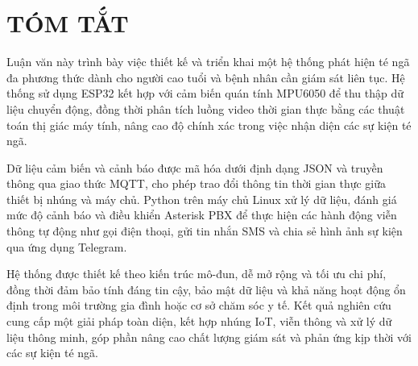 \chapter*{TÓM TẮT}

Luận văn này trình bày việc thiết kế và triển khai một hệ thống phát hiện té ngã đa phương thức dành cho người cao tuổi và bệnh nhân cần giám sát liên tục. Hệ thống sử dụng ESP32 kết hợp với cảm biến quán tính MPU6050 để thu thập dữ liệu chuyển động, đồng thời phân tích luồng video thời gian thực bằng các thuật toán thị giác máy tính, nâng cao độ chính xác trong việc nhận diện các sự kiện té ngã.

Dữ liệu cảm biến và cảnh báo được mã hóa dưới định dạng JSON và truyền thông qua giao thức MQTT, cho phép trao đổi thông tin thời gian thực giữa thiết bị nhúng và máy chủ. Python trên máy chủ Linux xử lý dữ liệu, đánh giá mức độ cảnh báo và điều khiển Asterisk PBX để thực hiện các hành động viễn thông tự động như gọi điện thoại, gửi tin nhắn SMS và chia sẻ hình ảnh sự kiện qua ứng dụng Telegram.

Hệ thống được thiết kế theo kiến trúc mô-đun, dễ mở rộng và tối ưu chi phí, đồng thời đảm bảo tính đáng tin cậy, bảo mật dữ liệu và khả năng hoạt động ổn định trong môi trường gia đình hoặc cơ sở chăm sóc y tế. Kết quả nghiên cứu cung cấp một giải pháp toàn diện, kết hợp nhúng IoT, viễn thông và xử lý dữ liệu thông minh, góp phần nâng cao chất lượng giám sát và phản ứng kịp thời với các sự kiện té ngã.

